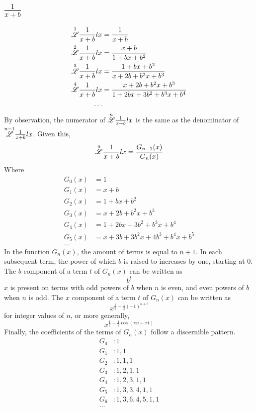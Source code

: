 \documentclass[12pt, letterpaper]{article}
\begin{document}
\subsection{$\frac{1}{x+b}$}
\begin{equation}
    \begin{split}
        \overset{1}{\mathscr{L}} \frac{1}{x+b} lx & = \frac{1}{x+b}\\
        \overset{2}{\mathscr{L}} \frac{1}{x+b} lx & = \frac{x+b}{1+bx+b^2}\\
        \overset{3}{\mathscr{L}} \frac{1}{x+b} lx & = \frac{1+bx+b^2}{x+2b+b^2x+b^3}\\
        \overset{4}{\mathscr{L}} \frac{1}{x+b} lx & = \frac{x+2b+b^2x+b^3}{1+2bx+3b^2+b^3x+b^4}\\
        \dots
    \end{split}
\end{equation}
By observation, the numerator of $\overset{n}{\mathscr{L}} \frac{1}{x+b} lx$ is the same as the denominator of $\overset{n-1}{\mathscr{L}} \frac{1}{x+b} lx$. Given this,
$$\overset{n}{\mathscr{L}} \frac{1}{x+b} lx = \frac{G_{n-1}(x)}{G_n(x)}$$
Where
\begin{equation}
    \begin{split}
        G_0(x) & = 1\\
        G_1(x) & = x+b\\
        G_2(x) & = 1+bx+b^2\\
        G_3(x) & = x+2b+b^2x+b^3\\
        G_4(x) & = 1+2bx+3b^2+b^3x+b^4\\
        G_5(x) & = x+3b+3b^2x+4b^3+b^4x+b^5\\
        \dots 
    \end{split}
\end{equation}
In the function $G_n(x)$, the amount of terms is equal to $n+1$. In each subsequent term, the power of which $b$ is raised to increases by one, starting at $0$. The $b$ component of a term $t$ of $G_n(x)$ can be written as
$$b^t$$
$x$ is present on terms with odd powers of $b$ when $n$ is even, and even powers of $b$ when $n$ is odd. The $x$ component of a term $t$ of $G_n(x)$ can be written as
$$x^{\frac{1}{2}-\frac{1}{2}(-1)^{n+t}}$$
for integer values of $n$, or more generally,
$$x^{\frac{1}{2}-\frac{1}{2}\cos(\pi n+\pi t)}$$
Finally, the coefficients of the terms of $G_n(x)$ follow a discernible pattern.
\begin{equation}
    \begin{split}
        G_0 & : 1\\
        G_1 & : 1, 1\\
        G_2 & : 1, 1, 1\\
        G_3 & : 1, 2, 1, 1\\
        G_4 & : 1, 2, 3, 1, 1\\
        G_5 & : 1, 3, 3, 4, 1, 1\\
        G_6 & : 1, 3, 6, 4, 5, 1, 1\\
        \dots
    \end{split}
\end{equation}
\end{document}
